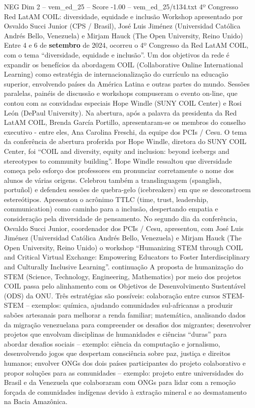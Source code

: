 \begin{textsample}{NEG Dim 2 – vem\_ed\_25 – Score -1.00 – vem\_ed\_25/t134.txt}  \label{ex:f2_neg_016}
4º Congresso Red LatAM COIL: diversidade, equidade e inclusão Workshop apresentado por Osvaldo Succi Junior (CPS / Brasil), José Luis Jiménez (Universidad Católica Andrés Bello, Venezuela) e Mirjam Hauck (The Open University, Reino Unido) Entre 4 e 6 de \textbf{setembro} de 2024, ocorreu o 4º Congresso da Red LatAM COIL, com o tema “diversidade, equidade e inclusão”.
Um dos objetivos da rede é expandir os benefícios da abordagem COIL (Collaborative Online International Learning) como estratégia de internacionalização do currículo na educação superior, envolvendo países da América Latina e outras partes do mundo.
Sessões paralelas, painéis de discussão e workshops compuseram o evento on-line, que contou com as convidadas especiais Hope Windle (SUNY COIL Center) e Rosi León (DePaul University).
Na abertura, após a palavra da presidenta da Red LatAM COIL, Brenda García Portillo, apresentaram-se os membros do conselho executivo - entre eles, Ana Carolina Freschi, da equipe dos PCIs / Cesu.
O tema da conferência de abertura proferida por Hope Windle, diretora do SUNY COIL Center, foi “COIL and diversity, equity and inclusion: beyond icebergs and stereotypes to community building”.
Hope Windle ressaltou que diversidade começa pelo esforço dos professores em pronunciar corretamente o nome dos alunos de várias origens.
Celebrou também a translinguagem (spanglish, portuñol) e defendeu sessões de quebra-gelo (icebreakers) em que se desconstroem estereótipos.
Apresentou o acrônimo TTLC (time, trust, leadership, communication) como caminho para a inclusão, despertando empatia e consideração pela diversidade de pensamento.
No segundo dia da conferência, Osvaldo Succi Junior, coordenador dos PCIs / Cesu, apresentou, com José Luis Jiménez (Universidad Católica Andrés Bello, Venezuela) e Mirjam Hauck (The Open University, Reino Unido) o workshop “Humanizing STEM through COIL and Critical Virtual Exchange: Empowering Educators to Foster Interdisciplinary and Culturally Inclusive Learning”. continuação A proposta de humanização do STEM (Science, Technology, Engineering, Mathematics) por meio dos projetos COIL passa pelo alinhamento com os Objetivos de Desenvolvimento Sustentável (ODS) da ONU.
Três estratégias são possíveis: colaboração entre cursos STEM-STEM – exemplos: química, ajudando comunidades sul-africanas a produzir sabões artesanais para melhorar a renda familiar; matemática, analisando dados da migração venezuelana para compreender os desafios dos migrantes; desenvolver projetos que envolvam disciplinas de humanidades e ciências “duras” para abordar desafios sociais – exemplo: ciência da computação e jornalismo, desenvolvendo jogos que despertam consciência sobre paz, justiça e direitos humanos; envolver ONGs dos dois países participantes do projeto colaborativo e propor soluções para as comunidades – exemplo: projeto entre universidades do Brasil e da Venezuela que colaboraram com ONGs para lidar com a remoção forçada de comunidades indígenas devido à extração mineral e ao desmatamento na Bacia Amazônica.

\end{textsample}
